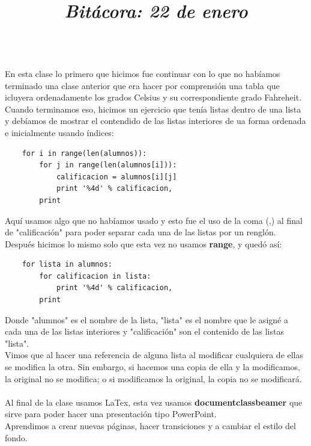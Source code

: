 \documentclass{article}
\begin{document}
	\title{\Huge\textbf{\color{purple}\textit{Bitácora: 22 de enero\\}}} \\
	En esta clase lo primero que hicimos fue continuar con lo que no habíamos terminado una clase anterior que era hacer por comprensión una tabla que icluyera ordenadamente los grados Celsius y su correspondiente grado Fahreheit. \\
	Cuando terminamos eso, hicimos un ejercicio que tenía listas dentro de una lista y debíamos de mostrar el contendido de las listas interiores de ua forma ordenada e inicialmente usando índices:\\
	\begin{verbatim}
	for i in range(len(alumnos)):
		for j in range(len(alumnos[i])):
			calificacion = alumnos[i][j]
			print '%4d' % calificacion,
		print 
	\end{verbatim}
	Aquí usamos algo que no habíamos usado y esto fue el uso de la coma (,) al final de "calificación" para poder separar cada una de las listas por un renglón. \\
	Después hicimos lo mismo solo que esta vez no usamos \textbf{range}, y quedó así: \\
	\begin{verbatim}
	for lista in alumnos:
		for calificacion in lista:
			print '%4d' % calificacion,
		print
	\end{verbatim} 
Donde "alumnos" es el nombre de la lista, "lista" es el nombre que le asigné a cada una de las listas interiores y "calificación" son el contenido de las listas "lista". \\ 
	Vimos que al hacer una referencia de alguna lista al modificar cualquiera de ellas se modifica la otra. Sin embargo, si hacemos una copia de ella y la modificamos, la original no se modifica; o si modificamos la original, la copia no se modificará. \\ \\
	Al final de la clase usamos LaTex, esta vez usamos \textbf{documentclass{beamer}} que sirve para poder hacer una presentación tipo PowerPoint. \\
	Aprendimos a crear nuevas páginas, hacer transiciones y a cambiar el estilo del fondo.
\end{document}
